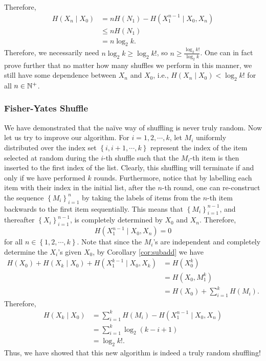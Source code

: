 \documentclass[math, code]{amznotes}
\theoremstyle{remark}
\begin{document}
Therefore, 
\begin{align*}
    H\left(X_n \mid X_0\right) & = nH\left(N_1\right) - H\left(X_1^{n - 1} \mid X_0, X_n\right) \\
    & \leq nH\left(N_1\right) \\
    & = n\log_2 k.
\end{align*}
Therefore, we necessarily need $n\log_2 k \geq \log_2 k!$, so $n \geq \frac{\log_2 k!}{\log_2 k}$. One can in fact prove further that no matter how many shuffles we perform in this manner, we still have some dependence between $X_n$ and $X_0$, i.e., $H\left(X_n \mid X_0\right) < \log_2 k!$ for all $n \in \mathbb{N}^+$.
\subsubsection{Fisher-Yates Shuffle}
We have demonstrated that the na\"{i}ve way of shuffling is never truly random. Now let us try to improve our algorithm. For $i = 1, 2, \cdots, k$, let $M_i$ uniformly distributed over the index set $\left\{i, i + 1, \cdots, k\right\}$ represent the index of the item selected at random during the $i$-th shuffle such that the $M_i$-th item is then inserted to the first index of the list. Clearly, this shuffling will terminate if and only if we have performed $k$ rounds. Furthermore, notice that by labelling each item with their index in the initial list, after the $n$-th round, one can re-construct the sequence $\left\{M_i\right\}_{i = 1}^n$ by taking the labels of items from the $n$-th item backwards to the first item sequentially. This means that $\left\{M_i\right\}_{i = 1}^{n - 1}$, and thereafter $\left\{X_i\right\}_{i = 1}^{n - 1}$, is completely determined by $X_0$ and $X_n$. Therefore,
\begin{equation*}
    H\left(X_1^{n - 1} \mid X_0, X_n\right) = 0
\end{equation*}
for all $n \in \left\{1, 2, \cdots, k\right\}$. Note that since the $M_i$'s are independent and completely determine the $X_i$'s given $X_0$, by Corollary \ref{cor:subadd} we have
\begin{align*}
    H\left(X_0\right) + H\left(X_k \mid X_0\right) + H\left(X_1^{k - 1} \mid X_0, X_k\right) & = H\left(X_0^k\right) \\
    & = H\left(X_0, M_1^k\right) \\
    & = H\left(X_0\right) + \sum_{i = 1}^{k}H\left(M_i\right).
\end{align*}
Therefore, 
\begin{align*}
    H\left(X_k \mid X_0\right) & = \sum_{i = 1}^{k}H\left(M_i\right) - H\left(X_1^{n - 1} \mid X_0, X_n\right) \\
    & = \sum_{i = 1}^{k}\log_2\left(k - i + 1\right) \\
    & = \log_2 k!.
\end{align*}
Thus, we have showed that this new algorithm is indeed a truly random shuffling!
\end{document}
